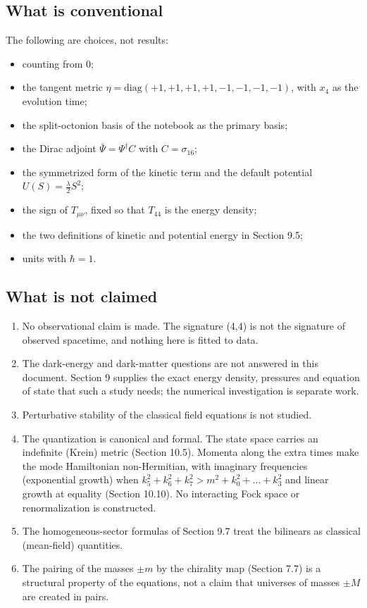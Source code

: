 \documentclass[11pt]{article}
\begin{document}
\subsection{What is conventional}

The following are choices, not results:

\begin{itemize}
\item counting from 0;
\item the tangent metric $\eta=\mathrm{diag}(+1,+1,+1,+1,-1,-1,-1,-1)$, with $x_4$ as the evolution time;
\item the split-octonion basis of the notebook as the primary basis;
\item the Dirac adjoint $\bar\Psi=\Psi^\dagger C$ with $C=\sigma_{16}$;
\item the symmetrized form of the kinetic term and the default potential $U(S)=\tfrac\lambda2S^2$;
\item the sign of $T_{\mu\nu}$, fixed so that $T_{44}$ is the energy density;
\item the two definitions of kinetic and potential energy in Section 9.5;
\item units with $\hbar=1$.
\end{itemize}

\subsection{What is not claimed}

\begin{enumerate}
\item No observational claim is made. The signature (4,4) is not the signature of observed spacetime, and nothing here is fitted to data.
\item The dark-energy and dark-matter questions are not answered in this document. Section 9 supplies the exact energy density, pressures and equation of state that such a study needs; the numerical investigation is separate work.
\item Perturbative stability of the classical field equations is not studied.
\item The quantization is canonical and formal. The state space carries an indefinite (Krein) metric (Section 10.5). Momenta along the extra times make the mode Hamiltonian non-Hermitian, with imaginary frequencies (exponential growth) when $k_5^2+k_6^2+k_7^2>m^2+k_0^2+\dots+k_3^2$ and linear growth at equality (Section 10.10). No interacting Fock space or renormalization is constructed.
\item The homogeneous-sector formulas of Section 9.7 treat the bilinears as classical (mean-field) quantities.
\item The pairing of the masses $\pm m$ by the chirality map (Section 7.7) is a structural property of the equations, not a claim that universes of masses $\pm M$ are created in pairs.
\end{enumerate}
\end{document}
